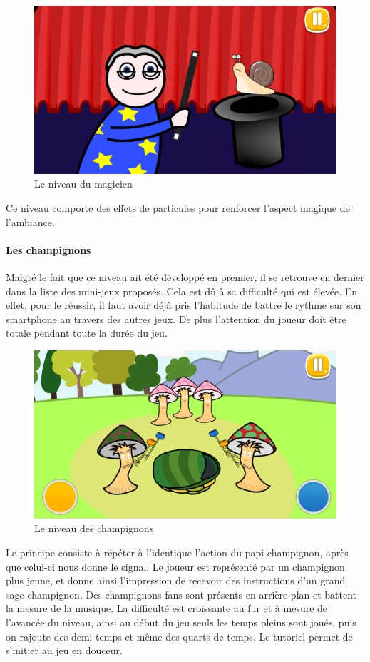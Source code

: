 \begin{figure}[H]\centering
  \includegraphics[scale=0.5]{./img/resultat_magicien.png}
  \caption{Le niveau du magicien}
  \label{niveau_magicien}
\end{figure}

Ce niveau comporte des effets de particules pour renforcer l'aspect magique de l'ambiance.

\paragraph{Les champignons}

Malgré le fait que ce niveau ait été développé en premier, il se retrouve en dernier dans la liste des mini-jeux proposés. Cela est dû à sa difficulté qui est élevée. En effet, pour le réussir, il faut avoir déjà pris l'habitude de battre le rythme sur son smartphone au travers des autres jeux. De plus l'attention du joueur doit être totale pendant toute la durée du jeu.

\begin{figure}[H]\centering
  \includegraphics[scale=0.5]{./img/resultat_champis.png}
  \caption{Le niveau des champignons}
  \label{niveau_champis}
\end{figure}

Le principe consiste à répéter à l'identique l'action du papi champignon, après que celui-ci nous donne le signal. Le joueur est représenté par un champignon plus jeune, et donne ainsi l'impression de recevoir des instructions d'un grand sage champignon. Des champignons fans sont présents en arrière-plan et battent la mesure de la musique. La difficulté est croissante au fur et à mesure de l'avancée du niveau, ainsi au début du jeu seuls les temps pleins sont joués, puis on rajoute des demi-temps et même des quarts de temps. Le tutoriel permet de s'initier au jeu en douceur.


